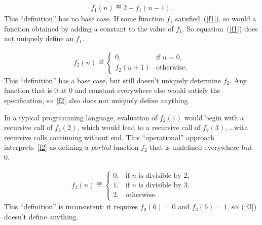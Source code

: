 \begin{eqnarray}\label{f1}
f_1(n)\eqdef 2+f_1(n-1).
\end{eqnarray}
This ``definition'' has no base case.  If some function $f_1$
satisfied~(\ref{f1}), so would a function obtained by adding a constant to
the value of $f_1$.  So equation~(\ref{f1}) does not uniquely define
an $f_1$.

\begin{eqnarray}\label{f2}
f_2(n) \eqdef
\begin{cases}
 0, & \text{if $n=0$},\\
 f_2(n+1) &  \text{otherwise}.
\end{cases}
\end{eqnarray}
This ``definition'' has a base case, but still doesn't uniquely determine
$f_2$.  Any function that is 0 at 0 and constant everywhere else would
satisfy the specification, so~\eqref{f2} also does not uniquely define
anything.

In a typical programming language, evaluation of $f_2(1)$ would begin with
a recursive call of $f_2(2)$, which would lead to a recursive call of
$f_2(3)$, \dots with recursive calls continuing without end.  This
``operational'' approach interprets~\eqref{f2} as defining a
\emph{partial} function $f_2$ that is undefined everywhere but 0.

\begin{eqnarray}\label{f3}
f_3(n) \eqdef \begin{cases}
  0, &  \text{if $n$ is divisible by 2,}\\
  1, &  \text{if $n$ is divisible by 3,}\\
  2, & \text{otherwise.}
 \end{cases}
\end{eqnarray}
This ``definition'' is inconsistent: it requires $f_3(6) = 0$ and $f_3(6)
=1$, so~(\ref{f3}) doesn't define anything.

